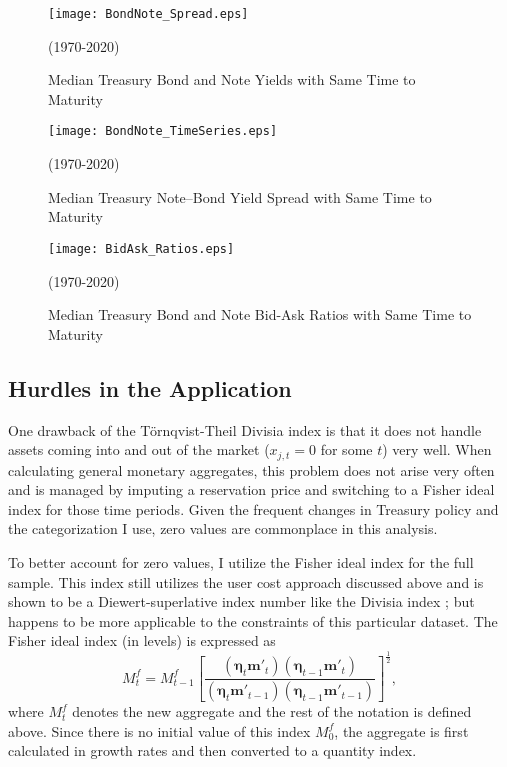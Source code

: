 \documentclass[11pt,a4paper,margin=1.5in]{article}
\begin{document}
\begin{figure}[p]
\centering
\texttt{[image: BondNote\_Spread.eps]}
\caption{Median Treasury Bond and Note Yields with Same Time to Maturity}{(1970-2020)}
\label{fig:YTM_Spread}
\end{figure}
\begin{figure}[p]
\centering
\texttt{[image: BondNote\_TimeSeries.eps]}
\caption{Median Treasury Note--Bond Yield Spread with Same Time to Maturity}{(1970-2020)}
\label{fig:YTM_SpreadTS}
\end{figure}
\begin{figure}[h]
\centering
\texttt{[image: BidAsk\_Ratios.eps]}
\caption{Median Treasury Bond and Note Bid-Ask Ratios with Same Time to Maturity}{(1970-2020)}
\label{fig:BidAsk_Ratios}
\end{figure}


\subsection{Hurdles in the Application}
\label{subsec:Hurdles}
One drawback of the T\"{o}rnqvist-Theil Divisia index is that it does not handle assets coming into and out of the market ($x_{j,t} = 0$ for some $t$) very well.
When calculating general monetary aggregates, this problem does not arise very often and is managed by imputing a reservation price and switching to a Fisher ideal index for those time periods.
Given the frequent changes in Treasury policy and the categorization I use, zero values are commonplace in this analysis.

To better account for zero values, I utilize the Fisher ideal index for the full sample.
This index still utilizes the user cost approach discussed above and is shown to be a Diewert-superlative index number like the Divisia index \citep{Diewert:1976}; but happens to be more applicable to the constraints of this particular dataset.
The Fisher ideal index (in levels) is expressed as
	\begin{equation}
		M^f_t = M^f_{t-1}\left[\frac{(\boldsymbol \eta_t \mathbf{m'}_t) (\boldsymbol \eta_{t-1} \mathbf{m'}_t)}{(\boldsymbol \eta_t \mathbf{m'}_{t-1}) (\boldsymbol \eta_{t-1} \mathbf{m'}_{t-1})}\right]^{\frac{1}{2}},
		\label{eq:FisherIdeal}
	\end{equation}
where $M^f_t$ denotes the new aggregate and the rest of the notation is defined above.
Since there is no initial value of this index $M^f_0$, the aggregate is first calculated in growth rates and then converted to a quantity index. 
\end{document}
